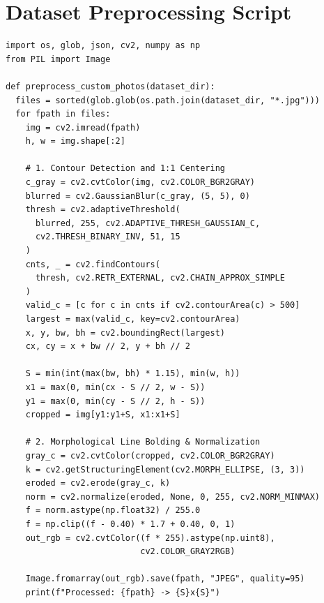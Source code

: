 \documentclass[11pt,a4paper,oneside]{report}
\begin{document}
\section{Dataset Preprocessing Script}
\begin{lstlisting}[style=py, caption={Complete Preprocessing and Centering Script.}]
import os, glob, json, cv2, numpy as np
from PIL import Image

def preprocess_custom_photos(dataset_dir):
  files = sorted(glob.glob(os.path.join(dataset_dir, "*.jpg")))
  for fpath in files:
    img = cv2.imread(fpath)
    h, w = img.shape[:2]
    
    # 1. Contour Detection and 1:1 Centering
    c_gray = cv2.cvtColor(img, cv2.COLOR_BGR2GRAY)
    blurred = cv2.GaussianBlur(c_gray, (5, 5), 0)
    thresh = cv2.adaptiveThreshold(
      blurred, 255, cv2.ADAPTIVE_THRESH_GAUSSIAN_C,
      cv2.THRESH_BINARY_INV, 51, 15
    )
    cnts, _ = cv2.findContours(
      thresh, cv2.RETR_EXTERNAL, cv2.CHAIN_APPROX_SIMPLE
    )
    valid_c = [c for c in cnts if cv2.contourArea(c) > 500]
    largest = max(valid_c, key=cv2.contourArea)
    x, y, bw, bh = cv2.boundingRect(largest)
    cx, cy = x + bw // 2, y + bh // 2
    
    S = min(int(max(bw, bh) * 1.15), min(w, h))
    x1 = max(0, min(cx - S // 2, w - S))
    y1 = max(0, min(cy - S // 2, h - S))
    cropped = img[y1:y1+S, x1:x1+S]
    
    # 2. Morphological Line Bolding & Normalization
    gray_c = cv2.cvtColor(cropped, cv2.COLOR_BGR2GRAY)
    k = cv2.getStructuringElement(cv2.MORPH_ELLIPSE, (3, 3))
    eroded = cv2.erode(gray_c, k)
    norm = cv2.normalize(eroded, None, 0, 255, cv2.NORM_MINMAX)
    f = norm.astype(np.float32) / 255.0
    f = np.clip((f - 0.40) * 1.7 + 0.40, 0, 1)
    out_rgb = cv2.cvtColor((f * 255).astype(np.uint8), 
                           cv2.COLOR_GRAY2RGB)
    
    Image.fromarray(out_rgb).save(fpath, "JPEG", quality=95)
    print(f"Processed: {fpath} -> {S}x{S}")
\end{lstlisting}
\end{document}
